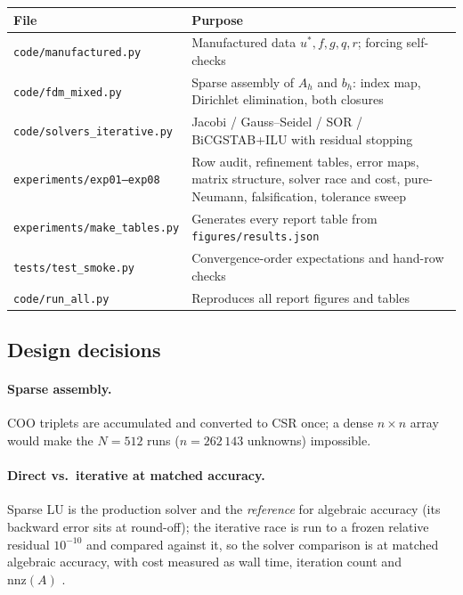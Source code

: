 \documentclass[11pt,a4paper]{article}
\begin{document}
\begin{table}[H]
\centering\small
\begin{tabular}{@{}p{} p{}@{}}
\toprule
\textbf{File} & \textbf{Purpose} \\
\midrule
\texttt{code/manufactured.py} & Manufactured data $u^*, f, g, q, r$;
forcing self-checks \\
\texttt{code/fdm\_mixed.py} & Sparse assembly of $A_h$ and $b_h$: index
map, Dirichlet elimination, both closures \\
\texttt{code/solvers\_iterative.py} & Jacobi / Gauss--Seidel / SOR /
BiCGSTAB+ILU with residual stopping \\
\texttt{experiments/exp01--exp08} & Row audit, refinement tables, error
maps, matrix structure, solver race and cost, pure-Neumann, falsification,
tolerance sweep \\
\texttt{experiments/make\_tables.py} & Generates every report table from
\texttt{figures/results.json} \\
\texttt{tests/test\_smoke.py} & Convergence-order expectations and hand-row
checks \\
\texttt{code/run\_all.py} & Reproduces all report figures and tables \\
\bottomrule
\end{tabular}
\end{table}

\subsection{Design decisions}

\paragraph{Sparse assembly.} COO triplets are accumulated and converted to
CSR once; a dense $n \times n$ array would make the $N = 512$ runs
($n = 262\,143$ unknowns) impossible.

\paragraph{Direct vs.\ iterative at matched accuracy.} Sparse LU is the
production solver and the \emph{reference} for algebraic accuracy (its
backward error sits at round-off); the iterative race is run to a frozen
relative residual $10^{-10}$ and compared against it, so the solver
comparison is at matched algebraic accuracy, with cost measured as wall
time, iteration count and $\mathrm{nnz}(A)$ \cite{virtanen2020}.
\end{document}
